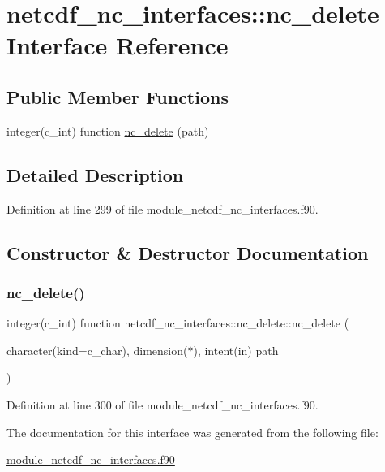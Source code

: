 \hypertarget{interfacenetcdf__nc__interfaces_1_1nc__delete}{}\section{netcdf\+\_\+nc\+\_\+interfaces\+:\+:nc\+\_\+delete Interface Reference}
\label{interfacenetcdf__nc__interfaces_1_1nc__delete}
\subsection*{Public Member Functions}
\begin{DoxyCompactItemize}
\item 
integer(c\+\_\+int) function \hyperlink{interfacenetcdf__nc__interfaces_1_1nc__delete_aef38e005fdfe99b5a7870e0f5cc2b98d}{nc\+\_\+delete} (path)
\end{DoxyCompactItemize}


\subsection{Detailed Description}


Definition at line 299 of file module\+\_\+netcdf\+\_\+nc\+\_\+interfaces.\+f90.



\subsection{Constructor \& Destructor Documentation}
\mbox{\label{interfacenetcdf__nc__interfaces_1_1nc__delete_aef38e005fdfe99b5a7870e0f5cc2b98d}} 
\subsubsection{\texorpdfstring{nc\+\_\+delete()}{nc\_delete()}}
{\footnotesize\ttfamily integer(c\+\_\+int) function netcdf\+\_\+nc\+\_\+interfaces\+::nc\+\_\+delete\+::nc\+\_\+delete (\begin{DoxyParamCaption}\item[{character(kind=c\+\_\+char), dimension($\ast$), intent(in)}]{path }\end{DoxyParamCaption})}



Definition at line 300 of file module\+\_\+netcdf\+\_\+nc\+\_\+interfaces.\+f90.



The documentation for this interface was generated from the following file\+:\begin{DoxyCompactItemize}
\item 
\hyperlink{module__netcdf__nc__interfaces_8f90}{module\+\_\+netcdf\+\_\+nc\+\_\+interfaces.\+f90}\end{DoxyCompactItemize}
